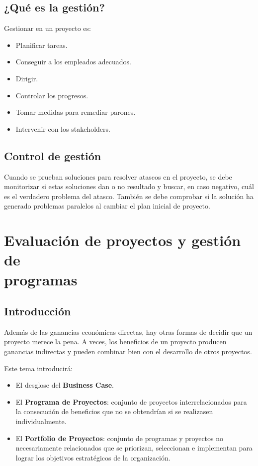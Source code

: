 \documentclass[12pt]{article}
\begin{document}
\subsection{¿Qué es la gestión?}
\label{1.13.0}

{Gestionar en un proyecto es:}

\begin{itemize}
    \item {Planificar tareas.}
    \item {Conseguir a los empleados adecuados.}
    \item {Dirigir.}
    \item {Controlar los progresos.}
    \item {Tomar medidas para remediar parones.}
    \item {Intervenir con los stakeholders.}
\end{itemize}

\subsection{Control de gestión}
\label{1.14.0}

{Cuando se prueban soluciones para resolver atascos en el proyecto, se debe monitorizar si estas soluciones dan o no resultado y buscar, en caso negativo, cuál es el verdadero problema del atasco. También se debe comprobar si la solución ha generado problemas paralelos al cambiar el plan inicial de proyecto.}

\newpage

\section[Evaluación de proyectos y gestión de programas]{Evaluación de proyectos y gestión de \\programas}
\label{2.0.0}
\subsection{Introducción}
\label{2.1.0}

{Además de las ganancias económicas directas, hay otras formas de decidir que un proyecto merece la pena. A veces, los beneficios de un proyecto producen ganancias indirectas y pueden combinar bien con el desarrollo de otros proyectos.} \bigskip

{Este tema introducirá:}
\begin{itemize}
    \item {El desglose del \textbf{Business Case}.}
    \item {El \textbf{Programa de Proyectos}: conjunto de proyectos interrelacionados para la consecución de beneficios que no se obtendrían si se realizasen individualmente.}
    \item {El \textbf{Portfolio de Proyectos}: conjunto de programas y proyectos no necesariamente relacionados que se priorizan, seleccionan e implementan para lograr los objetivos estratégicos de la organización.}
\end{itemize}
\end{document}

